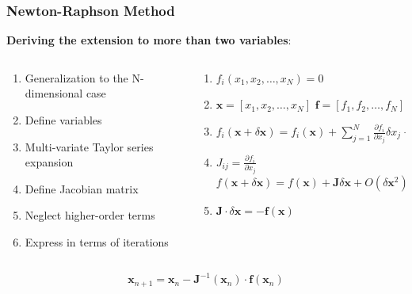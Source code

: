   \begin{frame}[fragile]
    \frametitle{Newton-Raphson Method}
    
    \textbf{Deriving the extension to more than two variables}:
    \begin{columns}
      \begin{column}{0.5\textwidth}
        \begin{enumerate}
          \item Generalization to the N-dimensional case
          \item Define variables
          \item Multi-variate Taylor series expansion
          \item Define Jacobian matrix
          \item Neglect higher-order terms
          \item Express in terms of iterations
        \end{enumerate}
      \end{column}
      \begin{column}{0.5\textwidth}
        \begin{enumerate}
          \item 
            \( f_i(x_1, x_2, \ldots, x_N) = 0 \)
          \item 
            \( \mathbf{x} = [x_1, x_2, \ldots, x_N] \)
            \( \mathbf{f} = [f_1, f_2, \ldots, f_N] \)
          \item 
            \( f_i(\mathbf{x} + \delta \mathbf{x}) = f_i(\mathbf{x}) + \sum_{j=1}^{N} \frac{\partial f_i}{\partial x_j} \delta x_j + O(\delta \mathbf{x}^2) \)
          \item 
            \( J_{ij} = \frac{\partial f_i}{\partial x_j} \)
            \( f(\mathbf{x} + \delta \mathbf{x}) = f(\mathbf{x}) + \mathbf{J} \delta \mathbf{x} + O(\delta \mathbf{x}^2) \)
          \item 
            \( \mathbf{J} \cdot \delta \mathbf{x} = -\mathbf{f}(\mathbf{x}) \)
        \end{enumerate}
      \end{column}
    \end{columns}
    \[
      \boxed{\mathbf{x}_{n+1} = \mathbf{x}_n-\mathbf{J}^{-1}(\mathbf{x}_n)\cdot\mathbf{f}(\mathbf{x}_n)}
    \]
  \end{frame}
  

